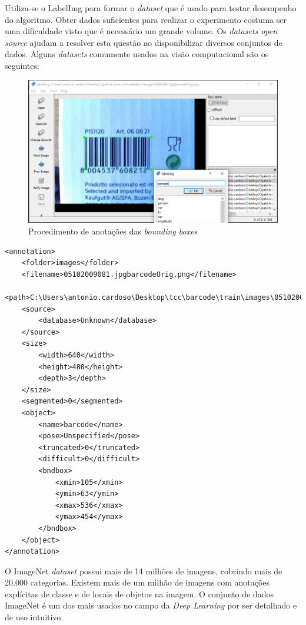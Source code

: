 Utiliza-se o LabelImg para formar o \textit{dataset} que é usado para testar desempenho do algoritmo. Obter dados suficientes para realizar o experimento costuma ser uma dificuldade visto que é necessário um grande volume. Os \textit{datasets open source} ajudam a resolver esta questão ao disponibilizar diversos conjuntos de dados. Alguns \textit{datasets} comumente usados na visão computacional são os seguintes:

\begin{figure}[htbp]
	\centering
	\includegraphics[width=0.9\linewidth]{figuras/MachineLearning/labelimg.png}
	\caption{Procedimento de anotações das \textit{bounding boxes}}
	\label{fig:labelimg}
\end{figure}

\begin{lstlisting}[caption=Arquivo XML gerado pelo LabelImg, label=cod:XML]
<annotation>
	<folder>images</folder>
	<filename>05102009081.jpgbarcodeOrig.png</filename>
	<path>C:\Users\antonio.cardoso\Desktop\tcc\barcode\train\images\05102009081.jpgbarcodeOrig.png</path>
	<source>
		<database>Unknown</database>
	</source>
	<size>
		<width>640</width>
		<height>480</height>
		<depth>3</depth>
	</size>
	<segmented>0</segmented>
	<object>
		<name>barcode</name>
		<pose>Unspecified</pose>
		<truncated>0</truncated>
		<difficult>0</difficult>
		<bndbox>
			<xmin>105</xmin>
			<ymin>63</ymin>
			<xmax>536</xmax>
			<ymax>454</ymax>
		</bndbox>
	</object>
</annotation>
\end{lstlisting}

O ImageNet \textit{dataset} \cite{deng2009imagenet} possui mais de 14 milhões de imagens, cobrindo mais de 20.000 categorias. Existem mais de um milhão de imagens com anotações explícitas de classe e de locais de objetos na imagem. O conjunto de dados ImageNet é um dos mais usados no campo da \textit{Deep Learning} por ser detalhado e de uso intuitivo. \cite{zhou2017application}

